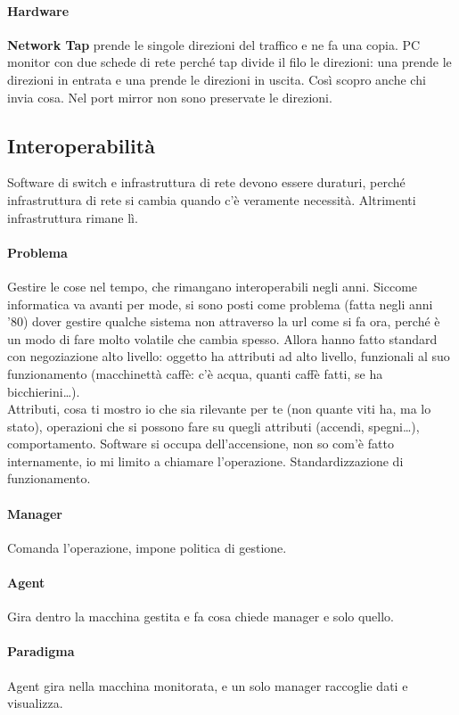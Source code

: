 \documentclass[10pt]{book}
\begin{document}
\paragraph{Hardware}\textbf{Network Tap} prende le singole direzioni del traffico e ne fa una copia. PC monitor con due schede di rete perché tap divide il filo le direzioni: una prende le direzioni in entrata e una prende le direzioni in uscita. Così scopro anche chi invia cosa. Nel port mirror non sono preservate le direzioni.
\pagebreak
\subsection{Interoperabilità}
Software di switch e infrastruttura di rete devono essere duraturi, perché infrastruttura di rete si cambia quando c'è veramente necessità. Altrimenti infrastruttura rimane lì. 
\paragraph{Problema} Gestire le cose nel tempo, che rimangano interoperabili negli anni. Siccome informatica va avanti per mode, si sono posti come problema (fatta negli anni '80) dover gestire qualche sistema non attraverso la url come si fa ora, perché è un modo di fare molto volatile che cambia spesso. Allora hanno fatto standard con negoziazione alto livello: oggetto ha attributi ad alto livello, funzionali al suo funzionamento (macchinettà caffè: c'è acqua, quanti caffè fatti, se ha bicchierini\ldots).\\
Attributi, cosa ti mostro io che sia rilevante per te (non quante viti ha, ma lo stato), operazioni che si possono fare su quegli attributi (accendi, spegni\ldots), comportamento. Software si occupa dell'accensione, non so com'è fatto internamente, io mi limito a chiamare l'operazione. Standardizzazione di funzionamento.
\paragraph{Manager} Comanda l'operazione, impone politica di gestione.
\paragraph{Agent} Gira dentro la macchina gestita e fa cosa chiede manager e solo quello.
\paragraph{Paradigma} Agent gira nella macchina monitorata, e un solo manager raccoglie dati e visualizza.
\end{document}
